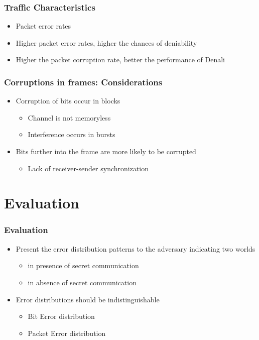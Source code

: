 \documentclass{beamer}
\begin{document}
\begin{frame}
  \frametitle{Traffic Characteristics}
    \begin{itemize}
    \item Packet error rates
    \item Higher packet error rates, higher the chances of deniability
    \item Higher the packet corruption rate, better the performance of Denali
    \end{itemize}
\end{frame}

\begin{frame}
  \frametitle{Corruptions in frames: Considerations}
    \begin{itemize}
    \item Corruption of bits occur in blocks
      \begin{itemize}
      \item Channel is not memoryless
      \item Interference occurs in bursts
      \end{itemize}
    \item Bits further into the frame are more likely to be corrupted
      \begin{itemize}
      \item Lack of receiver-sender synchronization
      \end{itemize}
    \end{itemize}  
\end{frame}

\section{Evaluation}
\begin{frame}
  \frametitle{Evaluation}
    \begin{itemize}
    \item Present the error distribution patterns to the adversary
      indicating two worlds 
      \begin{itemize}
      \item in presence of secret communication
      \item in absence of secret communication
      \end{itemize}
    \item Error distributions should be indistinguishable
      \begin{itemize}
      \item Bit Error distribution
      \item Packet Error distribution
    \end{itemize}
    \end{itemize}
\end{frame}
\end{document}
